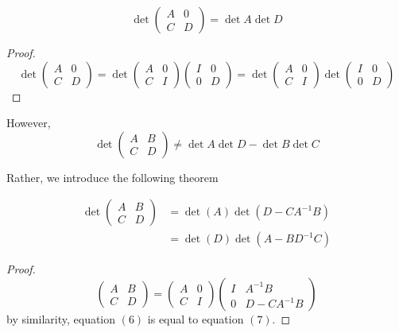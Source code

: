   \begin{corollary}
  \[\det{\begin{pmatrix}
  A&0\\C&D
  \end{pmatrix}} = \det{A} \det{D}\]
  \end{corollary}

  \begin{proof}
  \[ \det{\begin{pmatrix}
  A&0\\C&D 
  \end{pmatrix}} = \det{\begin{pmatrix}
  A&0\\C&I
  \end{pmatrix} \begin{pmatrix}
  I&0\\0&D
  \end{pmatrix}} = \det{\begin{pmatrix}
  A&0\\C&I
  \end{pmatrix}} \det{\begin{pmatrix}
  I&0\\0&D
  \end{pmatrix}}\]
  \end{proof}

  However, 
  \[\det{\begin{pmatrix}
  A&B\\C&D
  \end{pmatrix}} \neq \det{A} \det{D} - \det{B} \det{C}\]

  Rather, we introduce the following theorem

  \begin{theorem}
  \begin{align}
      \det{\begin{pmatrix} A&B\\C&D \end{pmatrix}}  & = \det{(A)} \det{(D - C A^{-1} B)} \\
      & = \det{(D)} \det{(A - B D^{-1} C)}
  \end{align}
  \end{theorem}
  \begin{proof}
  \[\begin{pmatrix} A&B\\C&D\end{pmatrix} = \begin{pmatrix}
  A&0\\C&I\end{pmatrix} \begin{pmatrix}
  I& A^{-1} B \\ 0 & D - C A^{-1} B
  \end{pmatrix}\]
  by similarity, equation $(6)$ is equal to equation $(7)$. 
  \end{proof}

